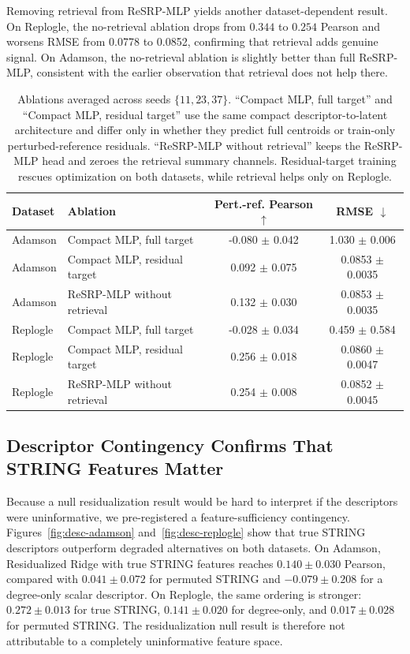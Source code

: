 \documentclass{article}
\begin{document}
Removing retrieval from ReSRP-MLP yields another dataset-dependent result. On Replogle, the no-retrieval ablation drops from $0.344$ to $0.254$ Pearson and worsens RMSE from 0.0778 to 0.0852, confirming that retrieval adds genuine signal. On Adamson, the no-retrieval ablation is slightly better than full ReSRP-MLP, consistent with the earlier observation that retrieval does not help there.

\begin{table}[t]
\caption{Ablations averaged across seeds $\{11,23,37\}$. ``Compact MLP, full target'' and ``Compact MLP, residual target'' use the same compact descriptor-to-latent architecture and differ only in whether they predict full centroids or train-only perturbed-reference residuals. ``ReSRP-MLP without retrieval'' keeps the ReSRP-MLP head and zeroes the retrieval summary channels. Residual-target training rescues optimization on both datasets, while retrieval helps only on Replogle.}
\label{tab:ablations}
\centering
\small
\begin{tabular}{llcc}
\toprule
Dataset & Ablation & Pert.-ref. Pearson $\uparrow$ & RMSE $\downarrow$ \\
\midrule
Adamson & Compact MLP, full target & -0.080 $\pm$ 0.042 & 1.030 $\pm$ 0.006 \\
Adamson & Compact MLP, residual target & 0.092 $\pm$ 0.075 & 0.0853 $\pm$ 0.0035 \\
Adamson & ReSRP-MLP without retrieval & 0.132 $\pm$ 0.030 & 0.0853 $\pm$ 0.0035 \\
\midrule
Replogle & Compact MLP, full target & -0.028 $\pm$ 0.034 & 0.459 $\pm$ 0.584 \\
Replogle & Compact MLP, residual target & 0.256 $\pm$ 0.018 & 0.0860 $\pm$ 0.0047 \\
Replogle & ReSRP-MLP without retrieval & 0.254 $\pm$ 0.008 & 0.0852 $\pm$ 0.0045 \\
\bottomrule
\end{tabular}
\end{table}

\subsection{Descriptor Contingency Confirms That STRING Features Matter}

Because a null residualization result would be hard to interpret if the descriptors were uninformative, we pre-registered a feature-sufficiency contingency. Figures~\ref{fig:desc-adamson} and~\ref{fig:desc-replogle} show that true STRING descriptors outperform degraded alternatives on both datasets. On Adamson, Residualized Ridge with true STRING features reaches $0.140 \pm 0.030$ Pearson, compared with $0.041 \pm 0.072$ for permuted STRING and $-0.079 \pm 0.208$ for a degree-only scalar descriptor. On Replogle, the same ordering is stronger: $0.272 \pm 0.013$ for true STRING, $0.141 \pm 0.020$ for degree-only, and $0.017 \pm 0.028$ for permuted STRING. The residualization null result is therefore not attributable to a completely uninformative feature space.
\end{document}
